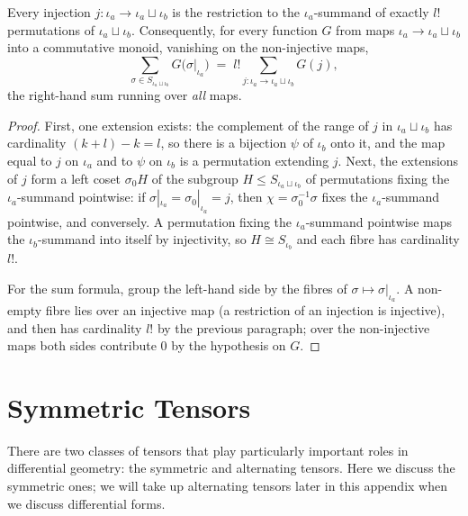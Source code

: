 \begin{lemma}
\label{lem:perm-extension-count}
\leanok
Every injection $j \colon \iota_a \to \iota_a \sqcup \iota_b$ is the restriction to the $\iota_a$-summand of exactly $l!$ permutations of $\iota_a \sqcup \iota_b$. Consequently, for every function $G$ from maps $\iota_a \to \iota_a \sqcup \iota_b$ into a commutative monoid, vanishing on the non-injective maps,
\[
\sum_{\sigma \in S_{\iota_a \sqcup \iota_b}} G\big(\sigma|_{\iota_a}\big) \;=\; l! \sum_{j \colon \iota_a \to \iota_a \sqcup \iota_b} G(j),
\]
the right-hand sum running over \emph{all} maps.
\end{lemma}
\begin{proof}
\leanok
First, one extension exists: the complement of the range of $j$ in $\iota_a \sqcup \iota_b$ has cardinality $(k+l) - k = l$, so there is a bijection $\psi$ of $\iota_b$ onto it, and the map equal to $j$ on $\iota_a$ and to $\psi$ on $\iota_b$ is a permutation extending $j$. Next, the extensions of $j$ form a left coset $\sigma_0 H$ of the subgroup $H \le S_{\iota_a \sqcup \iota_b}$ of permutations fixing the $\iota_a$-summand pointwise: if $\sigma|_{\iota_a} = \sigma_0|_{\iota_a} = j$, then $\chi = \sigma_0^{-1}\sigma$ fixes the $\iota_a$-summand pointwise, and conversely. A permutation fixing the $\iota_a$-summand pointwise maps the $\iota_b$-summand into itself by injectivity, so $H \cong S_{\iota_b}$ and each fibre has cardinality $l!$.

For the sum formula, group the left-hand side by the fibres of $\sigma \mapsto \sigma|_{\iota_a}$. A non-empty fibre lies over an injective map (a restriction of an injection is injective), and then has cardinality $l!$ by the previous paragraph; over the non-injective maps both sides contribute $0$ by the hypothesis on $G$.
\end{proof}

\section{Symmetric Tensors}

There are two classes of tensors that play particularly important roles in differential geometry: the symmetric and alternating tensors. Here we discuss the symmetric ones; we will take up alternating tensors later in this appendix when we discuss differential forms.

